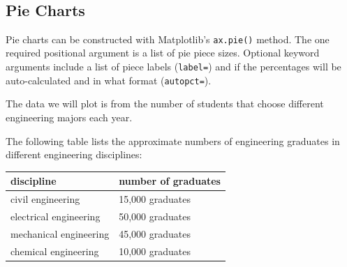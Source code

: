 \documentclass{book}
\begin{document}
    \begin{center}
    \end{center}
    { \hspace*{\fill} \\}
    

    
        \subsection{Pie Charts}\label{pie-charts}
    




    
        Pie charts can be constructed with Matplotlib's \lstinline!ax.pie()!
method. The one required positional argument is a list of pie piece
sizes. Optional keyword arguments include a list of piece labels
(\lstinline!label=!) and if the percentages will be auto-calculated and
in what format (\lstinline!autopct=!).

The data we will plot is from the number of students that choose
different engineering majors each year.

The following table lists the approximate numbers of engineering
graduates in different engineering disciplines:

\begin{longtable}[]{@{}ll@{}}
\toprule
discipline & number of graduates\tabularnewline
\midrule
\endhead
civil engineering & 15,000 graduates\tabularnewline
electrical engineering & 50,000 graduates\tabularnewline
mechanical engineering & 45,000 graduates\tabularnewline
chemical engineering & 10,000 graduates\tabularnewline
\bottomrule
\end{longtable}
    
\end{document}
